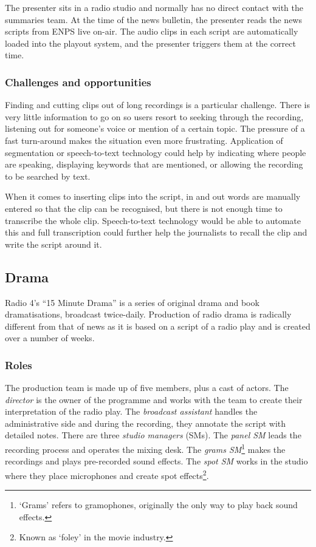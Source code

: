 The presenter sits in a radio studio and normally has no direct contact with the summaries team. At the time of the
news bulletin, the presenter reads the news scripts from ENPS live on-air. The audio clips in each script are
automatically loaded into the playout system, and the presenter triggers them at the correct time.

\subsubsection{Challenges and opportunities}
Finding and cutting clips out of long recordings is a particular challenge.  There is very little information to go on
so users resort to seeking through the recording, listening out for someone's voice or mention of a certain topic.  The
pressure of a fast turn-around makes the situation even more frustrating.  Application of segmentation or
speech-to-text technology could help by indicating where people are speaking, displaying keywords that are mentioned,
or allowing the recording to be searched by text.

When it comes to inserting clips into the script, in and out words are manually entered so that the clip can be
recognised, but there is not enough time to transcribe the whole clip. Speech-to-text technology would be able to
automate this and full transcription could further help the journalists to recall the clip and write the script around
it.

\subsection{Drama}\label{sec:drama}
Radio 4's ``15 Minute Drama'' is a series of original drama and book dramatisations, broadcast twice-daily. Production
of radio drama is radically different from that of news as it is based on a script of a radio play and is created over
a number of weeks.

\subsubsection{Roles}
The production team is made up of five members, plus a cast of actors. The \textit{director} is the owner of the
programme and works with the team to create their interpretation of the radio play. The \textit{broadcast assistant}
handles the administrative side and during the recording, they annotate the script with detailed notes. There are three
\textit{studio managers} (SMs). The \textit{panel SM} leads the recording process and operates the mixing desk.  The
\textit{grams SM}\footnote{`Grams' refers to gramophones, originally the only way to play back sound effects.} makes
the recordings and plays pre-recorded sound effects.  The \textit{spot SM} works in the studio where they place
microphones and create spot effects\footnote{Known as `foley' in the movie industry.}.

